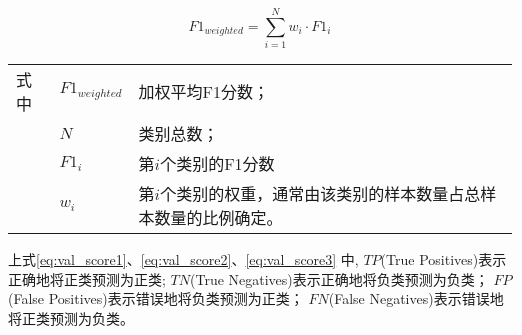 \begin{equation}
	\label{eq:val_score5}
	F1_{weighted} = \sum\limits_{i=1}^{N} w_i \cdot F1_i
\end{equation}
\begin{flushleft}
	\renewcommand\arraystretch{1.25}
	\begin{tabularx}{\textwidth}{@{}>{\normalsize\rm}l@{\quad}>{\normalsize\rm}l@{——}>{\normalsize\rm}X@{}}
		式中 & $F1_{weighted}$ & 加权平均F1分数；                          \\
		   & $N$             & 类别总数；                              \\
		   & $F1_i$          & 第$i$个类别的F1分数                       \\
		   & $w_i$           & 第$i$个类别的权重，通常由该类别的样本数量占总样本数量的比例确定。 \\
	\end{tabularx}\vspace{.5ex}%
\end{flushleft}



上式\ref{eq:val_score1}、\ref{eq:val_score2}、\ref{eq:val_score3}%
中,
$TP$(True Positives)表示正确地将正类预测为正类;
$TN$(True Negatives)表示正确地将负类预测为负类；
$FP$(False Positives)表示错误地将负类预测为正类；
$FN$(False Negatives)表示错误地将正类预测为负类。

